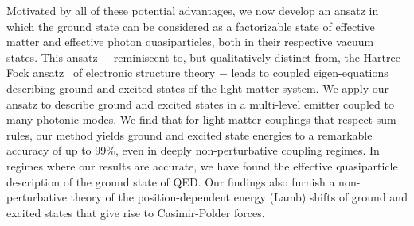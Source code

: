 \documentclass[aps,prl,twocolumn,
	groupedaddress,superscriptaddress,
	amsfonts,amssymb,amsmath,floatfix,
	citeautoscript]{revtex4-1}
\newcommand{\Jadd}[1]{\textcolor{blue}{#1}}
\begin{document}
Motivated by all of these potential advantages, we now develop an ansatz in which the ground state can be considered as a factorizable state of effective matter and effective photon quasiparticles, both in their respective vacuum states. This ansatz $-$ reminiscent to, but qualitatively distinct from, the Hartree-Fock ansatz~\cite{szabo1989} of electronic structure theory $-$ leads to coupled eigen-equations describing ground and excited states of the light-matter system. We apply our ansatz to describe ground and excited states in a multi-level emitter coupled to many photonic modes. We find that for light-matter couplings that respect sum rules, our method yields ground and excited state energies to a remarkable accuracy of up to 99\%, even in deeply non-perturbative coupling regimes.  In regimes where our results are accurate, we have found the effective quasiparticle description of the ground state of QED.  Our findings also furnish a non-perturbative theory of the position-dependent energy (Lamb) shifts of ground and excited states that give rise to Casimir-Polder forces.


\end{document}
